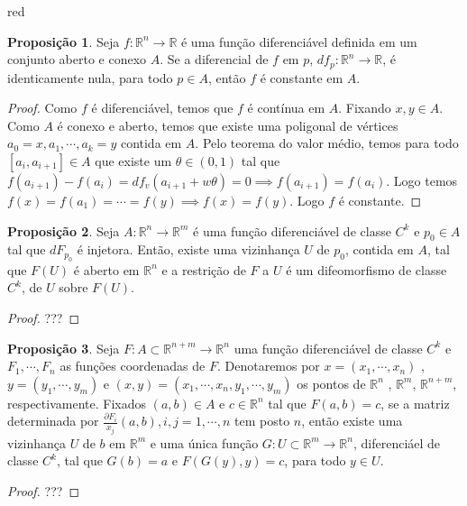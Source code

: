 \documentclass[12pt,leqno,twoside]{amsart}
\theoremstyle{definition}
\newtheorem{proposicao}{Proposição}[section]
\begin{document}
\begin{color}{red}
\vspace{0.3cm}

\begin{proposicao}
	Seja $f:\mathbb{R}^n \to \mathbb{R}$ é uma função diferenciável definida em um conjunto aberto e conexo $A$. Se a diferencial de $f$ em $p$, $df_p:\mathbb{R}^n \to \mathbb{R}$, é identicamente nula, para todo $p\in A$, então $f$ é constante em $A$.
\end{proposicao}
\begin{proof}
	Como $f$ é diferenciável, temos que $f$ é contínua em $A$. Fixando $x,y\in A$. Como $A$ é conexo e aberto, temos que existe uma poligonal de vértices $a_0 = x, a_1,\cdots, a_k = y$ contida em $A$. Pelo teorema do valor médio, temos para todo $[a_i, a_{i+1}]\in A$ que existe um $\theta \in (0,1)$ tal que $f(a_{i+1})-f(a_i) = df_v( a_{i+1} + w\theta ) = 0 \implies f(a_{i+1}) = f(a_{i})$. Logo temos $f(x) = f(a_1) = \cdots = f(y) \implies f(x) = f(y)$. Logo $f$ é constante.
\end{proof}

\vspace{0.3cm}

\begin{proposicao}
	Seja $A:\mathbb{R}^n \to \mathbb{R}^m$ é uma função diferenciável de classe $C^k$ e $p_0 \in A$ tal que $dF_{p_0}$ é injetora. Então, existe uma vizinhança $U$ de $p_0$, contida em $A$, tal que $F(U)$ é aberto em $\mathbb{R}^n$ e a restrição de $F$ a $U$ é um difeomorfismo de classe $C^k$, de $U$ sobre $F(U)$.
\end{proposicao}
\begin{proof}
	???
\end{proof}

\vspace{0.3cm}

\begin{proposicao}
	Seja $F:A\subset\mathbb{R}^{n+m} \to \mathbb{R}^n$  uma função diferenciável de classe $C^k$ e $F_1,\cdots, F_n$ as funções coordenadas de $F$. Denotaremos por $x = (x_1,\cdots, x_n)$ , $y = (y_1,\cdots,y_m)$ e $(x,y) = (x_1,\cdots, x_n, y_1, \cdots, y_m)$ os pontos de $\mathbb{R}^n$ , $\mathbb{R}^m$, $\mathbb{R}^{n+m}$, respectivamente. Fixados $(a,b)\in A$ e $c\in \mathbb{R}^n$ tal que $F(a,b) = c$, se a matriz determinada por $\frac{\partial F_i}{x_j}(a,b), i,j = 1,\cdots,n$ tem posto $n$, então existe uma vizinhança $U$ de $b$ em $\mathbb{R}^m$ e uma única função $G:U\subset \mathbb{R}^m \to \mathbb{R}^n$, diferenciáel de classe $C^k$, tal que $G(b) = a$ e $F(G(y), y) = c$, para todo $y\in U$.
\end{proposicao}
\begin{proof}
	???
\end{proof}


\end{color}
\end{document}
